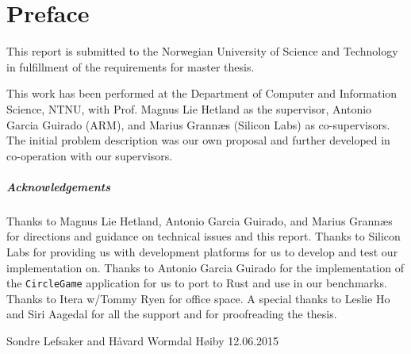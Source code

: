 
\chapter{Preface}
\label{chap:preface}

This report is submitted to the Norwegian University of Science and Technology in fulfillment of the requirements for master thesis.

This work has been performed at the Department of Computer and Information Science, NTNU, with Prof. Magnus Lie Hetland as the supervisor, Antonio Garcia Guirado (ARM), and Marius Grannæs (Silicon Labs) as co-supervisors.
The initial problem description was our own proposal and further developed in co-operation with our supervisors.

\paragraph{Acknowledgements} \hfill

Thanks to Magnus Lie Hetland, Antonio Garcia Guirado, and Marius Grannæs for directions and guidance on technical issues and this report.
Thanks to Silicon Labs for providing us with development platforms for us to develop and test our implementation on.
Thanks to Antonio Garcia Guirado for the implementation of the \texttt{CircleGame} application for us to port to Rust and use in our benchmarks.
Thanks to Itera w/Tommy Ryen for office space.
A special thanks to Leslie Ho and Siri Aagedal for all the support and for proofreading the thesis.

\hfill \break

Sondre Lefsaker and Håvard Wormdal Høiby \hfill 12.06.2015
